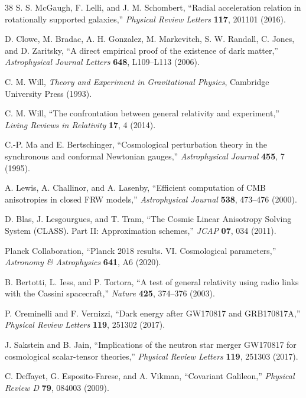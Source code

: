 \documentclass[12pt]{article}
\begin{document}
\begin{thebibliography}{38}
S. S. McGaugh, F. Lelli, and J. M. Schombert, ``Radial acceleration relation in rotationally supported galaxies,'' \textit{Physical Review Letters} \textbf{117}, 201101 (2016).

D. Clowe, M. Bradac, A. H. Gonzalez, M. Markevitch, S. W. Randall, C. Jones, and D. Zaritsky, ``A direct empirical proof of the existence of dark matter,'' \textit{Astrophysical Journal Letters} \textbf{648}, L109--L113 (2006).

C. M. Will, \textit{Theory and Experiment in Gravitational Physics}, Cambridge University Press (1993).

C. M. Will, ``The confrontation between general relativity and experiment,'' \textit{Living Reviews in Relativity} \textbf{17}, 4 (2014).

C.-P. Ma and E. Bertschinger, ``Cosmological perturbation theory in the synchronous and conformal Newtonian gauges,'' \textit{Astrophysical Journal} \textbf{455}, 7 (1995).

A. Lewis, A. Challinor, and A. Lasenby, ``Efficient computation of CMB anisotropies in closed FRW models,'' \textit{Astrophysical Journal} \textbf{538}, 473--476 (2000).

D. Blas, J. Lesgourgues, and T. Tram, ``The Cosmic Linear Anisotropy Solving System (CLASS). Part II: Approximation schemes,'' \textit{JCAP} \textbf{07}, 034 (2011).

Planck Collaboration, ``Planck 2018 results. VI. Cosmological parameters,'' \textit{Astronomy \& Astrophysics} \textbf{641}, A6 (2020).

B. Bertotti, L. Iess, and P. Tortora, ``A test of general relativity using radio links with the Cassini spacecraft,'' \textit{Nature} \textbf{425}, 374--376 (2003).

P. Creminelli and F. Vernizzi, ``Dark energy after GW170817 and GRB170817A,'' \textit{Physical Review Letters} \textbf{119}, 251302 (2017).

J. Sakstein and B. Jain, ``Implications of the neutron star merger GW170817 for cosmological scalar-tensor theories,'' \textit{Physical Review Letters} \textbf{119}, 251303 (2017).

C. Deffayet, G. Esposito-Farese, and A. Vikman, ``Covariant Galileon,'' \textit{Physical Review D} \textbf{79}, 084003 (2009).


\end{thebibliography}
\end{document}
